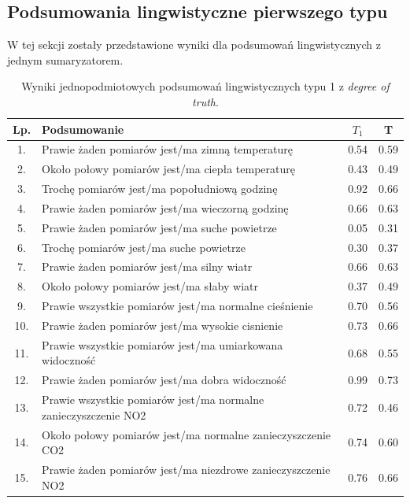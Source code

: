 \documentclass{article}
\begin{document}
\subsection{Podsumowania lingwistyczne pierwszego typu}
W tej sekcji zostały przedstawione wyniki dla podsumowań lingwistycznych z jednym sumaryzatorem.

\begin{table}[H]
    \centering
    \normalsize
    \begin{tabular}{|c|p{8cm}|c|c|}
    \hline
    \textbf{Lp.} &\textbf{Podsumowanie} & \textbf{\(T_1\)} & \textbf{T} \\ \hline
    1. & Prawie żaden pomiarów jest/ma zimną temperaturę & 0.54 & 0.59 \\ \hline
    2. & Około połowy pomiarów jest/ma ciepła temperaturę & 0.43 & 0.49 \\ \hline
    3. & Trochę pomiarów  jest/ma popołudniową godzinę & 0.92 & 0.66 \\ \hline
    4. & Prawie żaden pomiarów jest/ma wieczorną godzinę & 0.66 & 0.63 \\ \hline
    5. & Prawie żaden pomiarów jest/ma suche powietrze & 0.05 & 0.31 \\ \hline
    6. & Trochę pomiarów jest/ma suche powietrze & 0.30 & 0.37 \\ \hline
    7. & Prawie żaden pomiarów jest/ma silny wiatr & 0.66 & 0.63 \\ \hline
    8. & Około połowy pomiarów jest/ma słaby wiatr & 0.37 & 0.49 \\ \hline
    9. & Prawie wszystkie pomiarów jest/ma normalne cieśnienie & 0.70 & 0.56 \\ \hline
    10. & Prawie żaden pomiarów  jest/ma wysokie cisnienie & 0.73 & 0.66 \\ \hline
    11. & Prawie wszystkie pomiarów jest/ma umiarkowana widoczność & 0.68 & 0.55 \\ \hline
    12. & Prawie żaden pomiarów jest/ma dobra widoczność & 0.99 & 0.73 \\ \hline
    13. & Prawie wszystkie pomiarów  jest/ma normalne zanieczyszczenie NO2 & 0.72 & 0.46 \\ \hline
    14. & Około połowy pomiarów  jest/ma normalne zanieczyszczenie CO2 & 0.74 & 0.60 \\ \hline
    15. & Prawie żaden pomiarów  jest/ma niezdrowe zanieczyszczenie NO2 & 0.76 & 0.66 \\ \hline

    \end{tabular}
    \caption{Wyniki jednopodmiotowych podsumowań lingwistycznych typu 1 z \textit{degree of truth}.}
\end{table}
\end{document}
